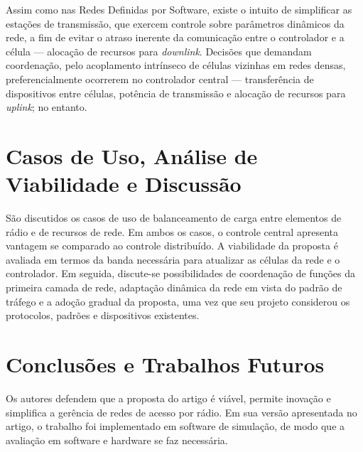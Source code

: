 Assim como nas Redes Definidas por Software, existe o intuito de simplificar as estações de transmissão, que exercem controle sobre parâmetros dinâmicos da rede, a fim de evitar o atraso inerente da comunicação entre o controlador e a célula --- alocação de recursos para \textit{downlink}. Decisões que demandam coordenação, pelo acoplamento intrínseco de células vizinhas em redes densas, preferencialmente ocorrerem no controlador central --- transferência de dispositivos entre células, potência de transmissão e alocação de recursos para \textit{uplink}; no entanto.


\section*{Casos de Uso, Análise de Viabilidade e Discussão}

São discutidos os casos de uso de balanceamento de carga entre elementos de rádio e de recursos de rede. Em ambos os casos, o controle central apresenta vantagem se comparado ao controle distribuído. A viabilidade da proposta é avaliada em termos da banda necessária para atualizar as células da rede e o controlador. Em seguida, discute-se possibilidades de coordenação de funções da primeira camada de rede, adaptação dinâmica da rede em vista do padrão de tráfego e a adoção gradual da proposta, uma vez que seu projeto considerou os protocolos, padrões e dispositivos existentes.


\section*{Conclusões e Trabalhos Futuros}

Os autores defendem que a proposta do artigo é viável, permite inovação e simplifica a gerência de redes de acesso por rádio. Em sua versão apresentada no artigo, o trabalho foi implementado em software de simulação, de modo que a avaliação em software e hardware se faz necessária.
